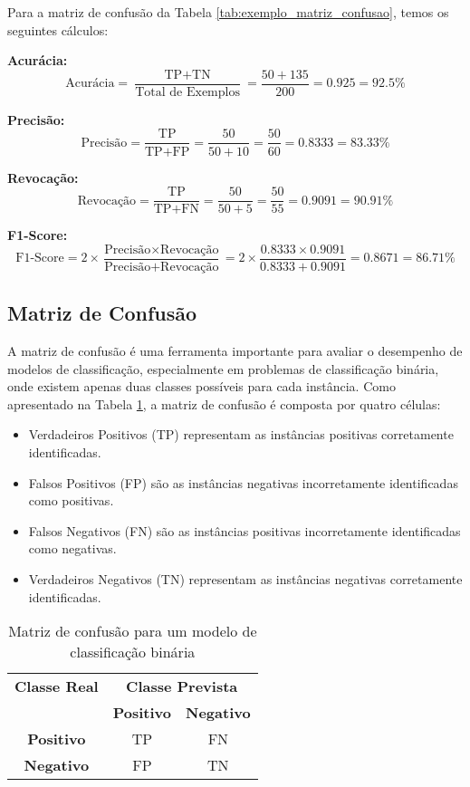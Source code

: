 Para a matriz de confusão da Tabela \ref{tab:exemplo_matriz_confusao}, temos os seguintes cálculos:

\textbf{Acurácia:}
\[ \text{Acurácia} = \frac{\text{TP} + \text{TN}}{\text{Total de Exemplos}} = \frac{50 + 135}{200} = 0.925 = 92.5\% \]

\textbf{Precisão:}
\[ \text{Precisão} = \frac{\text{TP}}{\text{TP} + \text{FP}} = \frac{50}{50 + 10} = \frac{50}{60} = 0.8333 = 83.33\% \]

\textbf{Revocação:}
\[ \text{Revocação} = \frac{\text{TP}}{\text{TP} + \text{FN}} = \frac{50}{50 + 5} = \frac{50}{55} = 0.9091 = 90.91\% \]

\textbf{F1-Score:}
\[ \text{F1-Score} = 2 \times \frac{\text{Precisão} \times \text{Revocação}}{\text{Precisão} + \text{Revocação}} = 2 \times \frac{0.8333 \times 0.9091}{0.8333 + 0.9091} = 0.8671 = 86.71\% \]


\subsection{Matriz de Confusão}

A matriz de confusão é uma ferramenta importante para avaliar o desempenho de modelos de classificação, especialmente em problemas de classificação binária, onde existem apenas duas classes possíveis para cada instância. Como apresentado na Tabela \ref{tab:confusao}, a matriz de confusão é composta por quatro células:

\begin{itemize}
    \item Verdadeiros Positivos (TP) representam as instâncias positivas corretamente identificadas.
    \item Falsos Positivos (FP) são as instâncias negativas incorretamente identificadas como positivas.
    \item Falsos Negativos (FN) são as instâncias positivas incorretamente identificadas como negativas.
    \item Verdadeiros Negativos (TN) representam as instâncias negativas corretamente identificadas.
\end{itemize}

\begin{table}[h]
\centering
\caption{Matriz de confusão para um modelo de classificação binária}
\label{tab:confusao}
\begin{tabular}{c|cc}
\multicolumn{1}{c}{\textbf{Classe Real}} & \multicolumn{2}{c}{\textbf{Classe Prevista}} \\ \cline{2-3}
\multicolumn{1}{c|}{} & \textbf{Positivo} & \textbf{Negativo} \\ \hline
\multicolumn{1}{c|}{\textbf{Positivo}} & \cellcolor{green!25}TP & \cellcolor{red!25}FN \\
\multicolumn{1}{c|}{\textbf{Negativo}} & \cellcolor{red!25}FP & \cellcolor{green!25}TN \\ \hline
\end{tabular}
\end{table}

